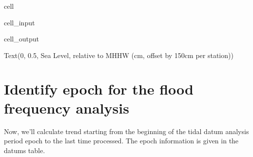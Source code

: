 \documentclass[letterpaper,10pt,english]{jupyterBook}
\begin{document}
\begin{sphinxuseclass}{cell}
\begin{sphinxVerbatimInput}
\begin{sphinxuseclass}{cell_input}
\end{sphinxuseclass}\end{sphinxVerbatimInput}
\begin{sphinxVerbatimOutput}

\begin{sphinxuseclass}{cell_output}
\begin{sphinxVerbatim}[commandchars=\\\{\}]
Text(0, 0.5, \PYGZsq{}Sea Level, relative to MHHW (cm, offset by 150cm per station)\PYGZsq{})
\end{sphinxVerbatim}

\noindent{}

\end{sphinxuseclass}\end{sphinxVerbatimOutput}

\end{sphinxuseclass}

\section{Identify epoch for the flood frequency analysis}
\label{\detokenize{notebooks/FloodFrequency:identify-epoch-for-the-flood-frequency-analysis}}
\sphinxAtStartPar
Now, we’ll calculate trend starting from the beginning of the tidal datum analysis period epoch to the last time processed. The  epoch information is given in the datums table.
\end{document}
